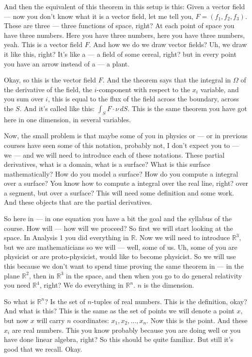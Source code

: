 \begin{spoken-clean}[00:07:45 - 00:09:01]
And then the equivalent of this theorem in this setup is this: Given a vector field --- now you don't know what it is a vector field, let me tell you, $F = (f_1, f_2, f_3)$. These are three --- three functions of space, right? At each point of space you have three numbers. Here you have three numbers, here you have three numbers, yeah. This is a vector field $F$. And how we do we draw vector fields? Uh, we draw it like this, right? It's like a --- a field of some cereal, right? but in every point you have an arrow instead of a --- a plant. 

Okay, so this is the vector field $F$. And the theorem says that the integral in $\Omega$ of the derivative of the field, the $i$-component with respect to the $x_i$ variable, and you sum over $i$, this is equal to the flux of the field across the boundary, across the $S$. And it's called like this: $\int_S F \cdot \nu \, dS$. This is the same theorem you have got here in one dimension, in several variables.
\end{spoken-clean}

\begin{spoken-clean}[00:09:01 - 00:10:45]
Now, the small problem is that maybe some of you in physics or --- or in previous courses have seen some of this notation, probably not, I don't expect you to --- we --- and we will need to introduce each of these notations. These partial derivatives, what is a domain, what is a surface? What is this surface mathematically? How do you model a surface? How do you compute a integral over a surface? You know how to compute a integral over the real line, right? over a segment, but over a surface? This will need some definition and some work. And these objects that are the partial derivatives. 

So here in --- in one equation you have a bit the goal and the syllabus of the course. How will --- how will we proceed? So first we will start looking at the space. In Analysis 1 you did everything in $\mathbb{R}$. Now we will need to introduce $\mathbb{R}^3$, but we are mathematicians so we will --- well, some of us. Uh, some of you are physicist or are proto-physicist, would like to become physicist. So we will use this because we don't want to spend time proving the same theorem in --- in the plane $\mathbb{R}^2$, then in $\mathbb{R}^3$ in the space, and then when you go to do general relativity you need $\mathbb{R}^4$, right? We do everything in $\mathbb{R}^n$. $n$ is the dimension.
\end{spoken-clean}

\begin{spoken-clean}[00:10:45 - 00:11:00]
So what is $\mathbb{R}^n$? Is the set of $n$-tuples of real numbers. This is the definition, okay? And what is this? This is the same as the set of points we will denote a point $x$, but now $x$ will carry $n$ coordinates: $x_1, x_2, \dots, x_n$. Now this is the point. And these $x_i$ are real numbers. This you know probably because you are doing well or you have done linear algebra, right? So this should be quite familiar. But still it's good that we recall. Okay.
\end{spoken-clean}
